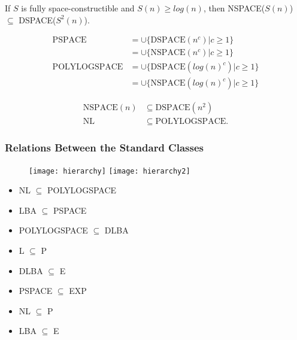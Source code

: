  If $S$ is fully space-constructible and $S(n) \ge
log(n)$, then NSPACE($S(n)$) $\subseteq$ DSPACE($S^2(n)$).

\begin{align*}
  \text{PSPACE} &= \cup \{\text{DSPACE}(n^c) | c \ge 1\}\\
  &= \cup \{\text{NSPACE}(n^c) | c \ge 1\} \\
  \text{POLYLOGSPACE} &= \cup\{\text{DSPACE}(log(n)^c) | c \ge 1\}\\
  &= \cup \{\text{NSPACE}(log(n)^c) | c \ge 1\}
\end{align*}

\begin{align*}
\text{NSPACE}(n) &\subseteq \text{DSPACE}(n^2)\\
\text{NL} &\subseteq  \text{POLYLOGSPACE}.
\end{align*}

\subsubsection{Relations Between the Standard Classes}
\begin{figure}[H]
  \centering
  \texttt{[image: hierarchy]}
  \texttt{[image: hierarchy2]}
\end{figure}

\begin{itemize}
  \item NL $\subseteq$ POLYLOGSPACE
  \item LBA $\subseteq$ PSPACE
\end{itemize}

\begin{itemize}
  \item POLYLOGSPACE $\subseteq$ DLBA
\end{itemize}

\begin{itemize}
  \item L $\subseteq$ P
  \item DLBA $\subseteq$ E
  \item PSPACE $\subseteq$ EXP
\end{itemize}

\begin{itemize}
  \item NL $\subseteq$ P 
  \item LBA $\subseteq$ E
\end{itemize}

